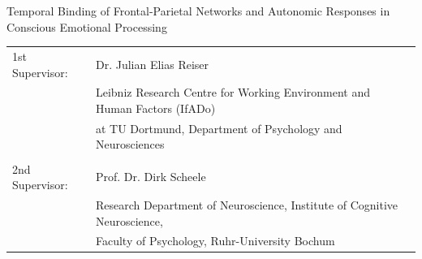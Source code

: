 \documentclass[
    12pt                %
]{article} %
\begin{document}
\begin{titlepage}
\begin{center}
        \vspace{0.2cm}
        Temporal Binding of Frontal-Parietal Networks and Autonomic Responses in Conscious Emotional Processing

        \vspace{0.5cm}
        \begin{minipage}{0.8\textwidth}
            \begin{tabular}{p{} p{}}
                1st Supervisor: & Dr. Julian Elias Reiser \\
                & Leibniz Research Centre for Working Environment and Human Factors (IfADo) \\
                & at TU Dortmund, Department of Psychology and Neurosciences\\
                \\
                2nd Supervisor: & Prof. Dr. Dirk Scheele \\
                & Research Department of Neuroscience, Institute of Cognitive Neuroscience, \\
                & Faculty of Psychology, Ruhr-University Bochum \\
            \end{tabular}
        \end{minipage}
        \vspace{\fill}
    \end{center}
\end{titlepage}
\newpage

\begin{abstract}
\end{abstract}
\cleardoublepage %


\tableofcontents
\newpage
\listoffigures
\newpage
\printglossary[style=long3col, type=\acronymtype, title=List of Acronyms] %
\newpage
{} %


\newpage
{} %
\printbibliography %
\end{document}
